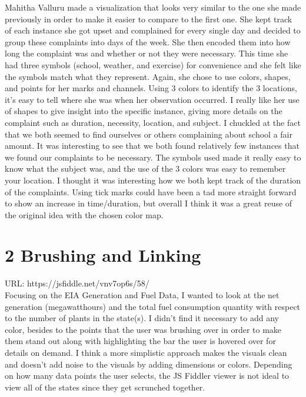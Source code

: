 \documentclass{neu_handout}
\begin{document}
Mahitha Valluru made a visualization that looks very similar to the one she made previously in order to make it easier to compare to the first one. She kept track of each instance she got upset and complained for every single day and decided to group these complaints into days of the week. She then encoded them into how long the complaint was and whether or not they were necessary. This time she had three symbols (school, weather, and exercise) for convenience and she felt like the symbols match what they represent. Again, she chose to use colors, shapes, and points for her marks and channels. Using 3 colors to identify the 3 locations, it’s easy to tell where she was when her observation occurred. I really like her use of shapes to give insight into the specific instance, giving more details on the complaint such as duration, necessity, location, and subject. I chuckled at the fact that we both seemed to find ourselves or others complaining about school a fair amount. It was interesting to see that we both found relatively few instances that we found our complaints to be necessary. The symbols used made it really easy to know what the subject was, and the use of the 3 colors was easy to remember your location. I thought it was interesting how we both kept track of the duration of the complaints. Using tick marks could have been a tad more straight forward to show an increase in time/duration, but overall I think it was a great reuse of the original idea with the chosen color map.


\section*{2 Brushing and Linking}

URL: https://jsfiddle.net/vnv7op6s/58/\\

Focusing on the EIA Generation and Fuel Data, I wanted to look at the net generation (megawatthours) and the total fuel consumption quantity with respect to the number of plants in the state(s). I didn't find it necessary to add any color, besides to the points that the user was brushing over in order to make them stand out along with highlighting the bar the user is hovered over for details on demand. I think a more simplistic approach makes the visuals clean and doesn't add noise to the visuals by adding dimensions or colors. Depending on how many data points the user selects, the JS Fiddler viewer is not ideal to view all of the states since they get scrunched together.
\end{document}

